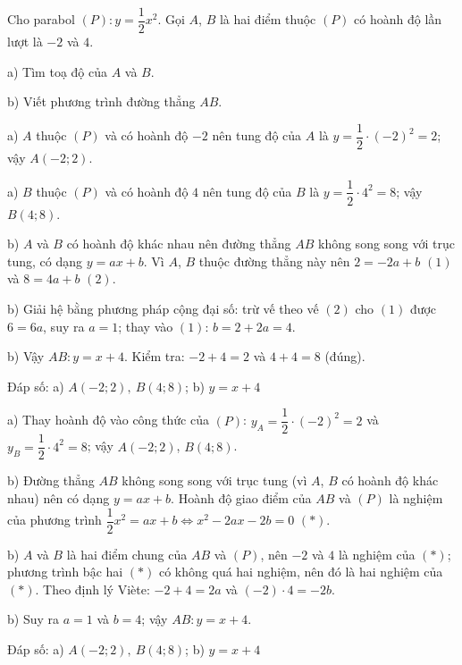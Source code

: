 \begin{problem}[9DS-HSB2-014]
Cho parabol $(P)\colon y = \dfrac{1}{2}x^2$. Gọi $A$, $B$ là hai điểm thuộc $(P)$ có hoành độ lần lượt là $-2$ và $4$.

a) Tìm toạ độ của $A$ và $B$.

b) Viết phương trình đường thẳng $AB$.

\begin{solution}
a) $A$ thuộc $(P)$ và có hoành độ $-2$ nên tung độ của $A$ là $y = \dfrac{1}{2} \cdot (-2)^2 = 2$; vậy $A(-2; 2)$.

a) $B$ thuộc $(P)$ và có hoành độ $4$ nên tung độ của $B$ là $y = \dfrac{1}{2} \cdot 4^2 = 8$; vậy $B(4; 8)$.

b) $A$ và $B$ có hoành độ khác nhau nên đường thẳng $AB$ không song song với trục tung, có dạng $y = ax + b$. Vì $A$, $B$ thuộc đường thẳng này nên $2 = -2a + b$ $(1)$ và $8 = 4a + b$ $(2)$.

b) Giải hệ bằng phương pháp cộng đại số: trừ vế theo vế $(2)$ cho $(1)$ được $6 = 6a$, suy ra $a = 1$; thay vào $(1)$: $b = 2 + 2a = 4$.

b) Vậy $AB: y = x + 4$. Kiểm tra: $-2 + 4 = 2$ và $4 + 4 = 8$ (đúng).

Đáp số: a) $\boxed{A(-2; 2),\ B(4; 8)}$; b) $\boxed{y = x + 4}$
\end{solution}

\begin{solution}
a) Thay hoành độ vào công thức của $(P)$: $y_A = \dfrac{1}{2} \cdot (-2)^2 = 2$ và $y_B = \dfrac{1}{2} \cdot 4^2 = 8$; vậy $A(-2; 2)$, $B(4; 8)$.

b) Đường thẳng $AB$ không song song với trục tung (vì $A$, $B$ có hoành độ khác nhau) nên có dạng $y = ax + b$. Hoành độ giao điểm của $AB$ và $(P)$ là nghiệm của phương trình $\dfrac{1}{2}x^2 = ax + b \Leftrightarrow x^2 - 2ax - 2b = 0$ $(*)$.

b) $A$ và $B$ là hai điểm chung của $AB$ và $(P)$, nên $-2$ và $4$ là nghiệm của $(*)$; phương trình bậc hai $(*)$ có không quá hai nghiệm, nên đó là hai nghiệm của $(*)$. Theo định lý Viète: $-2 + 4 = 2a$ và $(-2) \cdot 4 = -2b$.

b) Suy ra $a = 1$ và $b = 4$; vậy $AB: y = x + 4$.

Đáp số: a) $\boxed{A(-2; 2),\ B(4; 8)}$; b) $\boxed{y = x + 4}$
\end{solution}
\end{problem}

